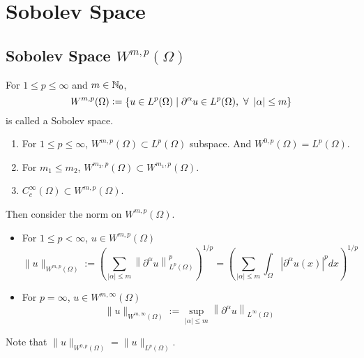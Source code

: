 \chapter{Sobolev Space} 

\section{Sobolev Space \texorpdfstring{$W^{m,p}(\Omega)$}{Wmp}}

\begin{defn}
	For $1 \leq p \leq \infty$ and $m \in \mathbb{N}_0$,
	\begin{equation*}
		W^{m,p}(\Omega) \vcentcolon= \left\{u \in L^p(\Omega) \mid \partial^\alpha u \in L^p(\Omega),~\forall~\left\lvert\alpha\right\lvert \leq m\right\}
	\end{equation*}
	is called a Sobolev space.
\end{defn}
\begin{rmk}
	\begin{enumerate}[label=(\arabic{*})]
		\item For $1 \leq p \leq \infty$, $W^{m,p}(\Omega) \subset L^p(\Omega)$ subspace. And $W^{0,p}(\Omega) = L^p(\Omega)$.
		\item For $m_1 \leq m_2$, $W^{m_2,p}(\Omega) \subset W^{m_1,p}(\Omega)$.
		\item $C^\infty_c(\Omega) \subset W^{m,p}(\Omega)$.
	\end{enumerate}
\end{rmk}

\noindent Then consider the norm on $W^{m,p}(\Omega)$.
\begin{itemize}
	\item For $1 \leq p < \infty$, $u \in W^{m,p}(\Omega)$
	\begin{equation*}
		\|u\|_{W^{m, p}(\Omega)}:=\left(\sum_{|\alpha| \leq m}\left\|\partial^\alpha u\right\|_{L^p(\Omega)}^p\right)^{1 / p}=\left(\sum_{|\alpha| \leq m} \int_{\Omega}\left|\partial^\alpha u(x)\right|^p d x\right)^{1 / p}
	\end{equation*}
	\item For $p = \infty$, $u \in W^{m,\infty}(\Omega)$
	\begin{equation*}
		\|u\|_{W^{m, \infty}(\Omega)}:=\sup _{|\alpha| \leq m}\left\|\partial^\alpha u\right\|_{L^{\infty}(\Omega)}
	\end{equation*}
\end{itemize}
Note that $\|u\|_{W^{0, p}(\Omega)}=\|u\|_{L^p(\Omega)}$.

